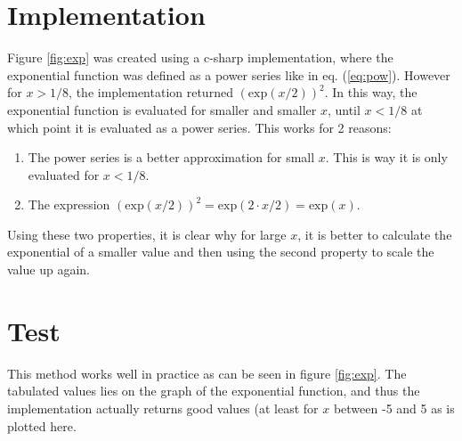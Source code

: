 \documentclass[twocolumn, a4paper, 12pt]{article}
\begin{document}
\section{Implementation}
Figure \ref{fig:exp} was created using a c-sharp implementation, where the exponential function was defined as a power series like in eq. (\ref{eq:pow}). However for $x > 1/8$, the implementation returned $(\mathrm{exp}(x/2))^2$. In this way, the exponential function is evaluated for smaller and smaller $x$, until $x < 1/8$ at which point it is evaluated as a power series. This works for 2 reasons:
\begin{enumerate}
	\item The power series is a better approximation for small $x$. This is way it is only evaluated for $x<1/8$.
	\item The expression $(\mathrm{exp}(x/2))^2 = \mathrm{exp}(2\cdot x/2) = \mathrm{exp}(x)$.
\end{enumerate}
Using these two properties, it is clear why for large $x$, it is better to calculate the exponential of a smaller value and then using the second property to scale the value up again.

\section{Test}
This method works well in practice as can be seen in figure \ref{fig:exp}. The tabulated values lies on the graph of the exponential function, and thus the implementation actually returns good values (at least for $x$ between -5 and 5 as is plotted here.
\end{document}
